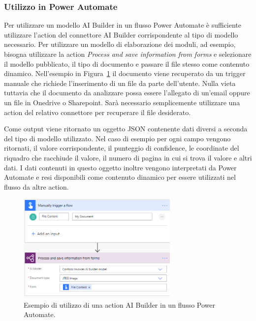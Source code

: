 \subsubsection{Utilizzo in Power Automate}
\label{ssec:utilizzoInPowerAutomate}
Per utilizzare un modello AI Builder in un flusso Power Automate è sufficiente utilizzare l'action  del connettore AI Builder corrispondente al tipo di modello necessario. Per utilizzare un modello di elaborazione dei moduli, ad esempio, bisogna utilizzare la action \textit{Process and save information from forms} e selezionare il modello pubblicato, il tipo di documento e passare il file stesso come contenuto dinamico. Nell'esempio in Figura~\ref{fig:flowAIBuilder} il documento viene recuperato da un trigger manuale che richiede l'inserimento di un file da parte dell'utente. Nulla vieta tuttavia che il documento da analizzare possa essere l'allegato di un'email oppure un file in Onedrive o Sharepoint. Sarà necessario semplicemente utilizzare una action del relativo connettore per recuperare il file desiderato.

Come output viene ritornato un oggetto JSON contenente dati diversi a seconda del tipo di modello utilizzato. Nel caso di esempio per ogni campo vengono ritornati, il valore corrispondente, il punteggio di confidence, le coordinate del riquadro che racchiude il valore, il numero di pagina in cui si trova il valore e altri dati.
I dati contenuti in questo oggetto inoltre vengono interpretati da Power Automate e resi disponibili come contenuto dinamico per essere utilizzati nel flusso da altre action.

\begin{figure}[!ht]
  \centering
  \includegraphics[width=0.7\textwidth]{flow-ai-builder.png}
  \caption{Esempio di utilizzo di una action AI Builder in un flusso Power Automate.}
  \label{fig:flowAIBuilder}
\end{figure}


